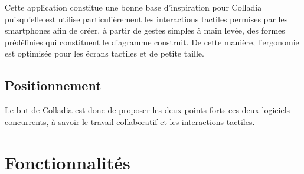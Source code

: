 \documentclass[a4paper,11pt]{article}
\begin{document}
Cette application constitue une bonne base d’inspiration pour Colladia puisqu’elle est utilise particulièrement les interactions tactiles permises par les smartphones afin de créer, à partir de gestes simples à main levée, des formes prédéfinies qui constituent le diagramme construit. De cette manière, l’ergonomie est optimisée pour les écrans tactiles et de petite taille.





\subsection{Positionnement}
Le but de Colladia est donc de proposer les deux points forts ces deux logiciels concurrents, à savoir le travail collaboratif et les interactions tactiles.




\section{Fonctionnalités}
\end{document}
